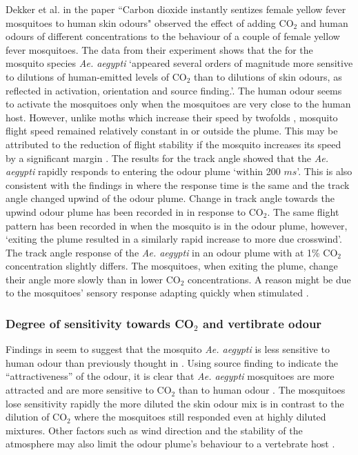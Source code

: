 Dekker et al. in the paper ``Carbon dioxide instantly sentizes female yellow fever mosquitoes to human skin odours" observed the effect of adding CO$_2$ and human odours of different concentrations to the behaviour of a couple of female yellow fever mosquitoes. The data from their experiment shows that the for the mosquito species \textit{Ae. aegypti} \lq appeared several orders of magnitude more sensitive to dilutions of human-emitted levels of CO$_2$ than to dilutions of skin odours, as reflected in activation, orientation and source finding.\rq\cite{Dekker2963}. The human odour seems to activate the mosquitoes only when the mosquitoes are very close to the human host. However, unlike moths which increase their speed by twofolds \cite{stelin2004}, mosquito flight speed remained relatively constant in or outside the plume. This may be attributed to the reduction of flight stability if the mosquito increases its speed by a significant margin \cite{lehmann2001production}. The results for the track angle showed that the \textit{Ae. aegypti} rapidly responds to entering the odour plume \lq within 200 $ms$\rq\cite{Dekker2963}. This is also consistent with the findings in \cite{vickers2000mechanisms} where the response time is the same and the track angle changed upwind of the odour plume. Change in track angle towards the upwind odour plume has been recorded in \cite{brady1989odour, paynter1993flight, schofield1997effects} in response to CO$_2$. The same flight pattern has been recorded in \cite{Dekker2963} when the mosquito is in the odour plume, however, \lq exiting the plume resulted in a similarly rapid increase to more due crosswind\rq. The track angle response of the \textit{Ae. aegypti} in an odour plume with at 1\% CO$_2$ concentration slightly differs.  The mosquitoes, when exiting the plume, change their angle more slowly than in lower CO$_2$ concentrations. A reason might be due to the mosquitoes' sensory response adapting quickly when stimulated \cite{grant1996electrophysiological}.
\subsubsection{Degree of sensitivity towards CO$_2$ and vertibrate odour}
Findings in \cite{Dekker2963} seem to suggest that the mosquito \textit{Ae. aegypti} is less sensitive to human odour than previously thought in \cite{gillies1980role, takken1999odor}.  Using source finding to indicate the ``attractiveness'' of the odour, it is clear that \textit{Ae. aegypti} mosquitoes are more attracted and are more sensitive to CO$_2$ than to human odour \cite{Dekker2963}. The mosquitoes lose sensitivity rapidly the more diluted the skin odour mix is in contrast to the dilution of CO$_2$ where the mosquitoes still responded even at highly diluted mixtures. Other factors such as wind direction and the stability of the atmosphere may also limit the odour plume's behaviour to a vertebrate host \cite{brady1989odour, murlis1992odor}. 

